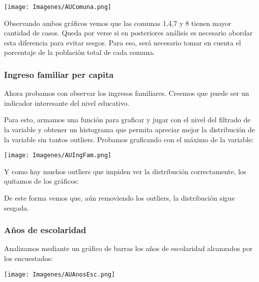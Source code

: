 \documentclass[a4paper]{article}
\begin{document}
            \begin{center}
                \texttt{[image: Imagenes/AUComuna.png]}    
            \end{center}

            Observando ambos gráficos vemos que las comunas 1,4,7 y 8 tienen mayor cantidad de casos. Queda por verse si en posteriores análisis es necesario abordar esta diferencia para evitar sesgos. Para eso, será necesario tomar en cuenta el porcentaje de la población total de cada comuna.
            
            \subsubsection{Ingreso familiar per capita}
            
            Ahora probamos con observar los ingresos familiares. Creemos que puede ser un indicador interesante del nivel educativo.
            
            Para esto, armamos una función para graficar y jugar con el nivel del filtrado de la variable y obtener un histograma que permita apreciar mejor la distribución de la variable sin tantos outliers. Probamos graficando con el máximo de la variable:
            
            \begin{center}
                \texttt{[image: Imagenes/AUIngFam.png]}
            \end{center}
            
            Y como hay muchos outliers que impiden ver la distribución correctamente, los quitamos de los gráficos:
            

            De este forma vemos que, aún removiendo los outliers, la distribución sigue sesgada.

            \subsubsection{Años de escolaridad}
            
            Analizamos mediante un gráfico de barras los años de escolaridad alcanzados por los encuestados:
            
            \begin{center}
                \texttt{[image: Imagenes/AUAnosEsc.png]}
            \end{center}
            
\end{document}
